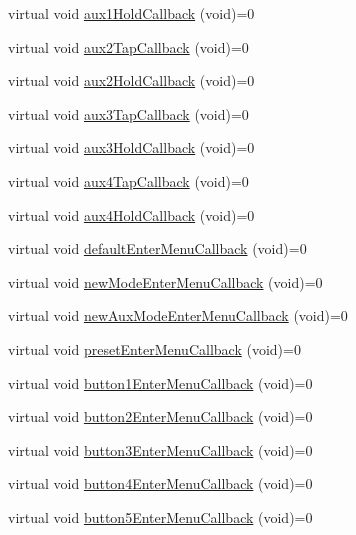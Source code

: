 \begin{DoxyCompactItemize}
\item 
virtual void \mbox{\hyperlink{class_via_u_i_a6fcc3b7cf9b97ccf403ed1817cb10d1d}{aux1\+Hold\+Callback}} (void)=0
\item 
virtual void \mbox{\hyperlink{class_via_u_i_ae5e009dc22002f62e6bff8dd76d2f745}{aux2\+Tap\+Callback}} (void)=0
\item 
virtual void \mbox{\hyperlink{class_via_u_i_a42545b69c2bbbb036f633140fd8007d6}{aux2\+Hold\+Callback}} (void)=0
\item 
virtual void \mbox{\hyperlink{class_via_u_i_a29026efd361a615374adce2462aa652a}{aux3\+Tap\+Callback}} (void)=0
\item 
virtual void \mbox{\hyperlink{class_via_u_i_a9ea505dfd800b261beabe8dc47b201d3}{aux3\+Hold\+Callback}} (void)=0
\item 
virtual void \mbox{\hyperlink{class_via_u_i_a0a43c527f027d11b266080d8cacb1d65}{aux4\+Tap\+Callback}} (void)=0
\item 
virtual void \mbox{\hyperlink{class_via_u_i_a884790ab6dac8e6f49104146ff620512}{aux4\+Hold\+Callback}} (void)=0
\item 
virtual void \mbox{\hyperlink{class_via_u_i_a226eb7b65b6035a611dd734d965fa7c2}{default\+Enter\+Menu\+Callback}} (void)=0
\item 
virtual void \mbox{\hyperlink{class_via_u_i_a2ebd72eaa0d26437d2c6320eb5fdf3e4}{new\+Mode\+Enter\+Menu\+Callback}} (void)=0
\item 
virtual void \mbox{\hyperlink{class_via_u_i_a6fdbe125cd3652807631631edc636d39}{new\+Aux\+Mode\+Enter\+Menu\+Callback}} (void)=0
\item 
virtual void \mbox{\hyperlink{class_via_u_i_ad4dfd9fa424267358cab83bec4ee1f23}{preset\+Enter\+Menu\+Callback}} (void)=0
\item 
virtual void \mbox{\hyperlink{class_via_u_i_ae00249c10af94437c357222328a56f82}{button1\+Enter\+Menu\+Callback}} (void)=0
\item 
virtual void \mbox{\hyperlink{class_via_u_i_ac7b7f919edba9a640e7009e1f9303a2d}{button2\+Enter\+Menu\+Callback}} (void)=0
\item 
virtual void \mbox{\hyperlink{class_via_u_i_a883081e46324dec82ad89f2e77cf4b65}{button3\+Enter\+Menu\+Callback}} (void)=0
\item 
virtual void \mbox{\hyperlink{class_via_u_i_a6db24e53e559b6fddd4cb1f918de40d6}{button4\+Enter\+Menu\+Callback}} (void)=0
\item 
virtual void \mbox{\hyperlink{class_via_u_i_adb40844fb1fa8e623f3a7eaecdbfad53}{button5\+Enter\+Menu\+Callback}} (void)=0

\end{DoxyCompactItemize}
